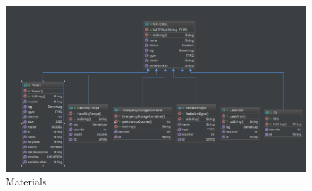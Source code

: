 \begin{figure}
\centering
\includegraphics[scale=0.6]{img/diagrams/materials.png}
 \caption{Materials}
 \label{sec:materials}
\end{figure}










































